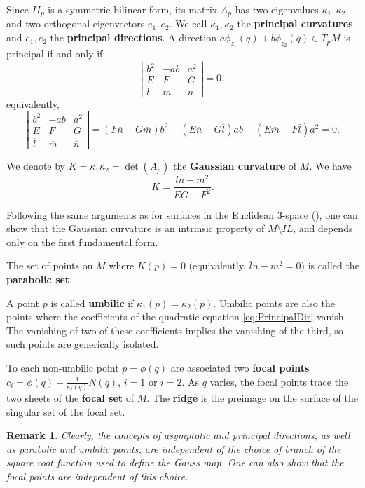 \documentclass[12pt,a4paper]{article}
\newtheorem{rem}[prop]{Remark}
\begin{document}
Since $II_p$ is a symmetric bilinear form, its matrix $A_p$ has two eigenvalues $\kappa_1, \kappa_2$ and two orthogonal eigenvectors $e_1, e_2$. We call  $\kappa_1, \kappa_2$ the {\bf principal curvatures} and 
$e_1, e_2$ the {\bf principal directions}. 
A direction $a\phi_{z_1}(q)+b\phi_{z_2}(q)\in T_pM$ is principal if and only if 
\begin{equation}
\left|
\begin{array}{ccc}
b^2&-ab&a^2\\
E&F&G\\
l&m&n
\end{array}
\right|=0,
\end{equation}
equivalently, 
\begin{equation}\label{eq:PrincipalDir}
\left|
\begin{array}{ccc}
b^2&-ab&a^2\\
E&F&G\\
\overline{l}&\overline{m}&\overline{n}
\end{array}
\right|=(F\overline{n}-G\overline{m})b^2 +(E\overline{n}-G\overline{l})ab+(E\overline{m}-F\overline{l})a^2=0.
\end{equation}

We denote by $K=\kappa_1\kappa_2=\det(A_p)$ the 
{\bf Gaussian curvature} of $M$.
We have
$$
K=\frac{ln-m^2}{EG-F^2}.
$$ 

Following the same arguments as for surfaces in the Euclidean 3-space (\cite{doCarmo}), one can show that the Gaussian curvature is an intrinsic property of $M\setminus IL$, and depends only on the first fundamental form. 

The set of points on $M$ where $K(p)=0$ (equivalently, $\overline{l}\overline{n}-\overline{m}^2=0$)
is called the {\bf parabolic set}. 

A point $p$ is called {\bf umbilic} if 
$\kappa_1(p)=\kappa_2(p).$ Umbilic points are also the points where the coefficients of the quadratic equation \eqref{eq:PrincipalDir} vanish.
The vanishing of two of these coefficients implies the vanishing of the third, so
such points are generically isolated.

To each non-umbilic point $p=\phi(q)$ are associated two \textbf{focal points} 
$c_i=\phi(q)+\frac{1}{\kappa_i(q)} N(q)$, $i=1$ or $i=2$.
As $q$ varies, the focal points trace the two sheets of the \textbf{focal set} of $M$. The \textbf{ridge} is the preimage on the surface of the singular set of the focal set.


\begin{rem}
{\rm
Clearly, the concepts of asymptotic and principal directions, as well as parabolic and umbilic points, are independent of the choice of branch of the square root function used to define the Gauss map.
One can also show that the focal points are independent of this choice.
}
\end{rem}
\end{document}
